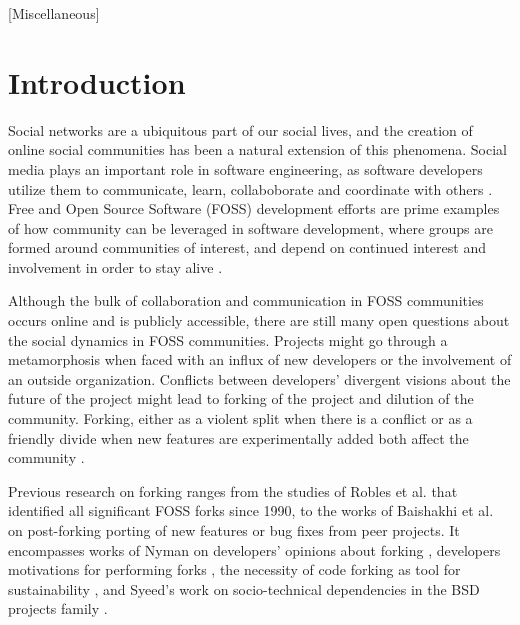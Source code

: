 \documentclass{acm_proc_article-sp}
\begin{document}
[Miscellaneous]



\section{Introduction}
\label{introduction}
Social networks are a ubiquitous part of our social lives, and the creation of online social communities has been a natural extension of this phenomena. Social media plays an important role in software engineering, as software developers utilize them to communicate, learn, collaboborate and coordinate with others \cite{Storey}. Free and Open Source Software (FOSS) development efforts are prime examples of how community can be leveraged in software development, where groups are formed around communities of interest, and depend on continued interest and involvement in order to stay alive \cite{NymanCodeForking}.

Although the bulk of collaboration and communication in FOSS communities occurs online and is publicly accessible, there are still many open questions about the social dynamics in FOSS communities. Projects might go through a metamorphosis when faced with an influx of new developers or the involvement of an outside organization. Conflicts between developers' divergent visions about the future of the project might lead to forking of the project and dilution of the community. Forking, either as a violent split when there is a conflict or as a friendly divide when new features are experimentally added both affect the community \cite{Bezrukova}.

Previous research on forking ranges from the studies of Robles et al. \cite{Robles} that identified all significant FOSS forks since 1990, to the works of Baishakhi et al. \cite{Baishakhi} on post-forking porting of new features or bug fixes from peer projects. It encompasses works of Nyman on developers' opinions about forking \cite{NymanHackersForking}, developers motivations for performing forks \cite{NymanToForkOrNotToFork}, the necessity of code forking as tool for sustainability \cite{NymanForkingSustainability}, and Syeed's work on socio-technical dependencies in the BSD projects family \cite{Syeed}.
\end{document}
